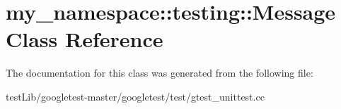 \hypertarget{classmy__namespace_1_1testing_1_1Message}{}\section{my\+\_\+namespace\+:\+:testing\+:\+:Message Class Reference}
\label{classmy__namespace_1_1testing_1_1Message}


The documentation for this class was generated from the following file\+:\begin{DoxyCompactItemize}
\item 
test\+Lib/googletest-\/master/googletest/test/gtest\+\_\+unittest.\+cc\end{DoxyCompactItemize}
